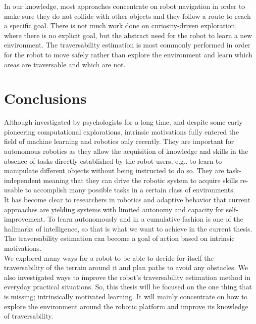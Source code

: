 \documentclass[12pt,a4paper]{report}
\begin{document}
	In our knowledge, most approaches concentrate on robot navigation in order to 
	make sure they do not collide with other objects and they follow a route to 
	reach a specific goal. There is not much work done on curiosity-driven 
	exploration, where there is no explicit goal, but the abstract need for the 
	robot to learn a new environment. The traversability estimation is most commonly 
	performed in order for the robot to move safely rather than explore the 
	environment and learn which areas are traversable and which are not.
	\\
		
	\section{Conclusions}
	\label{sec:bg:concl}
	
	Although investigated by psychologists for a long time, and despite some early 
	pioneering computational explorations, intrinsic motivations fully entered the 
	field of machine learning and robotics only recently. They are important for 
	autonomous robotics as they allow the acquisition of knowledge and skills in the 
	absence of tasks directly established by the robot users, e.g., to learn to 
	manipulate different objects without being instructed to do so. They are 
	task-independent meaning that they can drive the robotic system to acquire skills 
	re-usable to accomplish many possible tasks in a certain class of environments.
	\\
	
	It has become clear to researchers in robotics and adaptive behavior that 
	current approaches are yielding systems with limited autonomy and capacity for 
	self-improvement. To learn autonomously and in a cumulative fashion is one of 
	the hallmarks of intelligence, so that is what we want to achieve in the current 
	thesis. The traversability estimation can become a goal of action based on 
	intrinsic motivations.
	\\
	
	We explored many ways for a robot to be able to decide for itself the 
	traversability of the terrain around it and plan paths to avoid any obstacles. 
	We also investigated ways to improve the robot's traversability estimation 
	method in everyday practical situations. So, this thesis will be focused on the 
	one thing that is missing; intrinsically motivated learning. It will mainly 
	concentrate on how to explore the environment around the robotic platform and 
	improve its knowledge of traversability.
	\\\\
	
\end{document}
